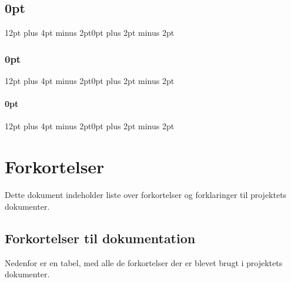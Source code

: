 
\usepackage[explicit]{titlesec}
\usepackage{longtable,tabu}
\usepackage{longtable}
\usepackage{todonotes}


\titlespacing\section{0pt}{12pt plus 4pt minus 2pt}{0pt plus 2pt minus 2pt}
\titlespacing\subsection{0pt}{12pt plus 4pt minus 2pt}{0pt plus 2pt minus 2pt}
\titlespacing\subsubsection{0pt}{12pt plus 4pt minus 2pt}{0pt plus 2pt minus 2pt}
\raggedbottom




\tableofcontents

\chapter{Forkortelser}
Dette dokument indeholder liste over forkortelser og forklaringer til projektets dokumenter. 

\section{Forkortelser til dokumentation}
Nedenfor er en tabel, med alle de forkortelser der er blevet brugt i projektets dokumenter. 

